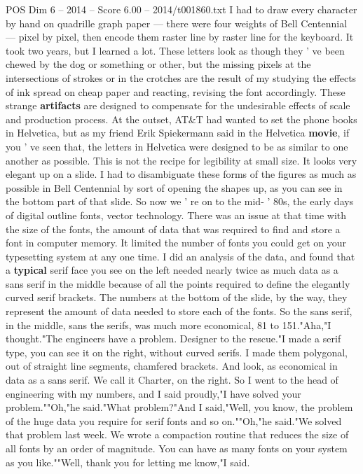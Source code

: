 \begin{textsample}{POS Dim 6 – 2014 – Score 6.00 – 2014/t001860.txt}
I had to draw every character by hand on quadrille graph paper — there were four weights of Bell Centennial — pixel by pixel, then encode them raster line by raster line for the keyboard.
It took two years, but I learned a lot.
These letters look as though they ' ve been chewed by the dog or something or other, but the missing pixels at the intersections of strokes or in the crotches are the result of my studying the effects of ink spread on cheap paper and reacting, revising the font accordingly.
These strange \textbf{artifacts} are designed to compensate for the undesirable effects of scale and production process.
At the outset, AT\&T had wanted to set the phone books in Helvetica, but as my friend Erik Spiekermann said in the Helvetica \textbf{movie}, if you ' ve seen that, the letters in Helvetica were designed to be as similar to one another as possible.
This is not the recipe for legibility at small size.
It looks very elegant up on a slide.
I had to disambiguate these forms of the figures as much as possible in Bell Centennial by sort of opening the shapes up, as you can see in the bottom part of that slide.
So now we ' re on to the mid- ' 80s, the early days of digital outline fonts, vector technology.
There was an issue at that time with the size of the fonts, the amount of data that was required to find and store a font in computer memory.
It limited the number of fonts you could get on your typesetting system at any one time.
I did an analysis of the data, and found that a \textbf{typical} serif face you see on the left needed nearly twice as much data as a sans serif in the middle because of all the points required to define the elegantly curved serif brackets.
The numbers at the bottom of the slide, by the way, they represent the amount of data needed to store each of the fonts.
So the sans serif, in the middle, sans the serifs, was much more economical, 81 to 151."Aha,"I thought."The engineers have a problem.
Designer to the rescue."I made a serif type, you can see it on the right, without curved serifs.
I made them polygonal, out of straight line segments, chamfered brackets.
And look, as economical in data as a sans serif.
We call it Charter, on the right.
So I went to the head of engineering with my numbers, and I said proudly,"I have solved your problem.""Oh,"he said."What problem?"And I said,"Well, you know, the problem of the huge data you require for serif fonts and so on.""Oh,"he said."We solved that problem last week.
We wrote a compaction routine that reduces the size of all fonts by an order of magnitude.
You can have as many fonts on your system as you like.""Well, thank you for letting me know,"I said.

\end{textsample}
